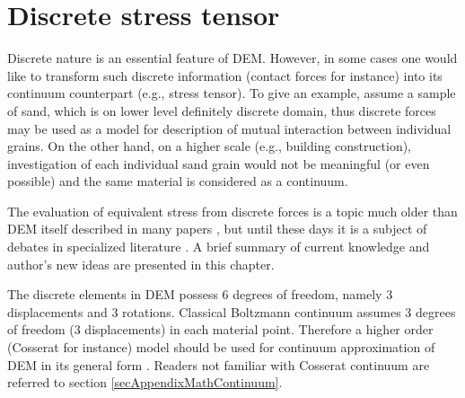 \chapter{Discrete stress tensor}\label{chapDiscreteStress}
Discrete nature is an essential feature of DEM.
However, in some cases one would like to transform such discrete information (contact forces for instance) into its continuum counterpart (e.g., stress tensor).
To give an example, assume a sample of sand, which is on lower level definitely discrete domain, thus discrete forces may be used as a model for description of mutual interaction between individual grains.
On the other hand, on a higher scale (e.g., building construction), investigation of each individual sand grain would not be meaningful (or even possible) and the same material is considered as a continuum.

The evaluation of equivalent stress from discrete forces is a topic much older than DEM itself \cite{Love1927a} described in many papers \cite{Alonsoarroquin2011a,ChangKuhn2005a,Bagi1996a},
but until these days it is a subject of debates in specialized literature \cite{BardetVardoulakis2001a,Bagi2003a,Kuhn2003a,BardetVardoulakis2003a,BardetVardoulakis2003b}.
A brief summary of current knowledge and author's new ideas are presented in this chapter.

The discrete elements in DEM possess 6 degrees of freedom, namely 3 displacements and 3 rotations.
Classical Boltzmann continuum assumes 3 degrees of freedom (3 displacements) in each material point.
Therefore a higher order (Cosserat for instance) model should be used for continuum approximation of DEM in its general form \cite{Alonsoarroquin2011a}.
Readers not familiar with Cosserat continuum are referred to section \ref{secAppendixMathContinuum}.




